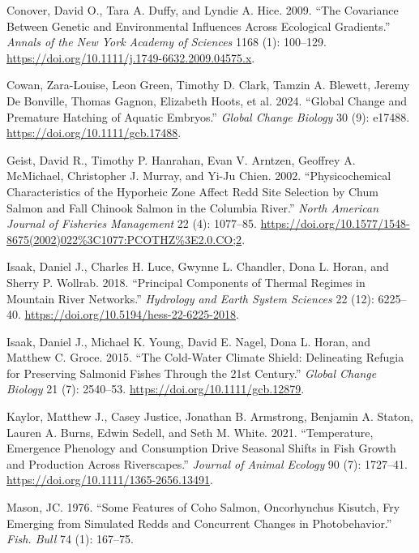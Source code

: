 \documentclass[webpdf,large,contemporary,namedate]{oup-authoring-template}
\newlength{\cslhangindent}
\newenvironment{CSLReferences}[2] %
 {\begin{list}{}{%
  \setlength{\itemindent}{0pt}
  \setlength{\leftmargin}{0pt}
  \setlength{\parsep}{0pt}
  \ifodd #1
   \setlength{\leftmargin}{\cslhangindent}
   \setlength{\itemindent}{-1\cslhangindent}
  \fi
  \setlength{\itemsep}{#2\baselineskip}}}
 {\end{list}}
\theoremstyle{thmstyleone}
\theoremstyle{thmstyletwo}
\theoremstyle{thmstylethree}
\begin{document}
\begin{CSLReferences}{1}{0}
Conover, David O., Tara A. Duffy, and Lyndie A. Hice. 2009. {``The
Covariance Between Genetic and Environmental Influences Across
Ecological Gradients.''} \emph{Annals of the New York Academy of
Sciences} 1168 (1): 100--129.
\url{https://doi.org/10.1111/j.1749-6632.2009.04575.x}.

Cowan, Zara-Louise, Leon Green, Timothy D. Clark, Tamzin A. Blewett,
Jeremy De Bonville, Thomas Gagnon, Elizabeth Hoots, et al. 2024.
{``Global Change and Premature Hatching of Aquatic Embryos.''}
\emph{Global Change Biology} 30 (9): e17488.
\url{https://doi.org/10.1111/gcb.17488}.

Geist, David R., Timothy P. Hanrahan, Evan V. Arntzen, Geoffrey A.
McMichael, Christopher J. Murray, and Yi-Ju Chien. 2002.
{``Physicochemical Characteristics of the Hyporheic Zone Affect Redd
Site Selection by Chum Salmon and Fall Chinook Salmon in the Columbia
River.''} \emph{North American Journal of Fisheries Management} 22 (4):
1077--85.
\url{https://doi.org/10.1577/1548-8675(2002)022\%3C1077:PCOTHZ\%3E2.0.CO;2}.

Isaak, Daniel J., Charles H. Luce, Gwynne L. Chandler, Dona L. Horan,
and Sherry P. Wollrab. 2018. {``Principal Components of Thermal Regimes
in Mountain River Networks.''} \emph{Hydrology and Earth System
Sciences} 22 (12): 6225--40.
\url{https://doi.org/10.5194/hess-22-6225-2018}.

Isaak, Daniel J., Michael K. Young, David E. Nagel, Dona L. Horan, and
Matthew C. Groce. 2015. {``The Cold-Water Climate Shield: Delineating
Refugia for Preserving Salmonid Fishes Through the 21st Century.''}
\emph{Global Change Biology} 21 (7): 2540--53.
\url{https://doi.org/10.1111/gcb.12879}.

Kaylor, Matthew J., Casey Justice, Jonathan B. Armstrong, Benjamin A.
Staton, Lauren A. Burns, Edwin Sedell, and Seth M. White. 2021.
{``Temperature, Emergence Phenology and Consumption Drive Seasonal
Shifts in Fish Growth and Production Across Riverscapes.''}
\emph{Journal of Animal Ecology} 90 (7): 1727--41.
\url{https://doi.org/10.1111/1365-2656.13491}.

Mason, JC. 1976. {``Some Features of Coho Salmon, Oncorhynchus Kisutch,
Fry Emerging from Simulated Redds and Concurrent Changes in
Photobehavior.''} \emph{Fish. Bull} 74 (1): 167--75.


\end{CSLReferences}
\end{document}
